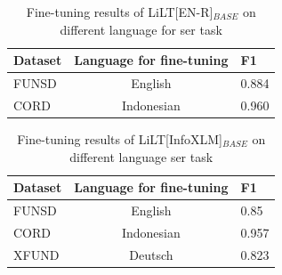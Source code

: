  \begin{table}[!ht]
     \centering
     \begin{tabular}{lcl}
     \toprule
     \textbf{Dataset} &\textbf{Language for fine-tuning} &\textbf{F1} \\ \midrule
          FUNSD& English& 0.884 \\
          CORD& Indonesian &0.960 \\ \bottomrule
     \end{tabular}
     \caption{Fine-tuning results of LiLT[EN-R]\(_{BASE}\) on different language for \acrshort{ser} task}
     \label{tab:compare_dataset_f1_english}
 \end{table}

\begin{table}[!ht]
    \centering
    \begin{tabular}{lcl}
    \toprule
    \textbf{Dataset}&\textbf{Language for fine-tuning}& \textbf{F1}\\ \midrule
         FUNSD& English&0.85  \\
         CORD& Indonesian & 0.957\\
         XFUND& Deutsch & 0.823 \\ \bottomrule
    \end{tabular}
    \caption{Fine-tuning results of LiLT[InfoXLM]\(_{BASE}\) on different language \acrshort{ser} task}
    \label{tab:compare_datasets_f1_multilingual}
\end{table}


